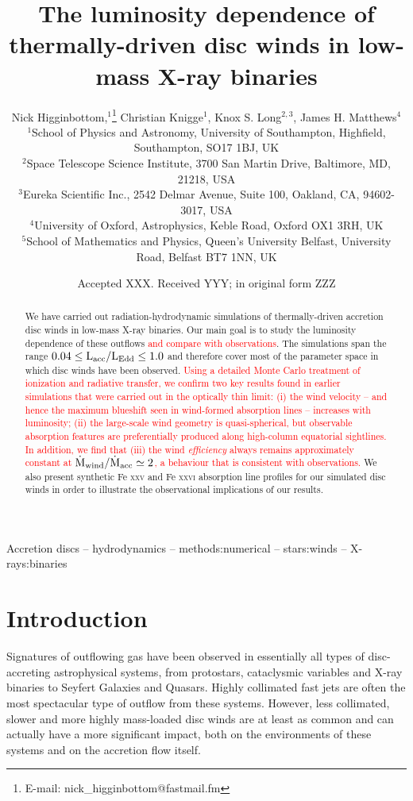 \documentclass[a4paper,fleqn,usenatbib]{mnras}
\title[The luminosity dependence of disc winds in LMXBs]{The luminosity dependence of thermally-driven disc winds in low-mass X-ray binaries}
\author[N. Higginbottom et. al]
{Nick Higginbottom,$^{1}$\thanks{E-mail: nick\_higginbottom@fastmail.fm}
Christian Knigge$^{1}$, Knox S. Long$^{2,3}$, 
James H. Matthews$^{4}$ \newauthor{and
Edward J. Parkinson$^{1}$.}
\\
$^{1}$School of Physics and Astronomy, University of Southampton, Highfield, Southampton, SO17 1BJ, UK\\
$^{2}$Space Telescope Science Institute, 3700 San Martin Drive, Baltimore, MD, 21218, USA\\
$^{3}$Eureka Scientific Inc., 2542 Delmar Avenue, Suite 100, Oakland, CA, 94602-3017, USA\\
$^{4}$University of Oxford, Astrophysics, Keble Road, Oxford OX1 3RH, UK\\
$^{5}$School of Mathematics and Physics, Queen's University Belfast, University Road, Belfast 
BT7 1NN, UK\\
}
\date{Accepted XXX. Received YYY; in original form ZZZ}
\begin{document}
\label{firstpage}
\pagerange{\pageref{firstpage}--\pageref{lastpage}}
\maketitle

\begin{abstract}

  We have carried out radiation-hydrodynamic simulations of
  thermally-driven accretion disc winds in low-mass X-ray binaries. Our main
  goal is to study the luminosity dependence of these outflows \textcolor{red}{
  and compare with observations}. The 
  simulations span the range 
  $\rm{0.04 \leq L_{acc}/L_{Edd} \leq 1.0}$ and therefore cover most
  of the parameter space in which disc winds have been observed. \textcolor{red}{
  Using a detailed Monte Carlo treatment of ionization and radiative transfer, 
  we confirm two key results found in earlier simulations that were carried out in the optically thin limit:
  (i) the wind velocity -- and hence the maximum blueshift seen
  in wind-formed absorption lines -- increases with luminosity;
  (ii) the large-scale wind geometry is quasi-spherical, but 
  observable absorption features are preferentially produced along
  high-column equatorial sightlines. In addition, we find that (iii) the wind {\em
  efficiency} always remains approximately
  constant at $\rm{\dot{M}_{wind}/\dot{M}_{acc} \simeq 2}$, a behaviour that is 
  consistent with observations.}
  We also present synthetic Fe \textsc{xxv}
  and Fe \textsc{xxvi} absorption line profiles for our simulated disc winds in order
  to illustrate the observational implications of our results.

\end{abstract}

\begin{keywords}
Accretion discs -- hydrodynamics -- methods:numerical -- stars:winds -- X-rays:binaries
\end{keywords}



\section{Introduction}
Signatures of outflowing gas have been observed in essentially all
types of disc-accreting astrophysical systems, from protostars,
cataclysmic variables and X-ray binaries to Seyfert Galaxies and
Quasars. Highly collimated fast jets are often the most spectacular
type of outflow from these systems. However, less collimated, slower
and more highly mass-loaded disc winds are at least as common and can 
actually have a more significant impact, both on the environments of
these systems and on the accretion flow itself. 
 
\end{document}

